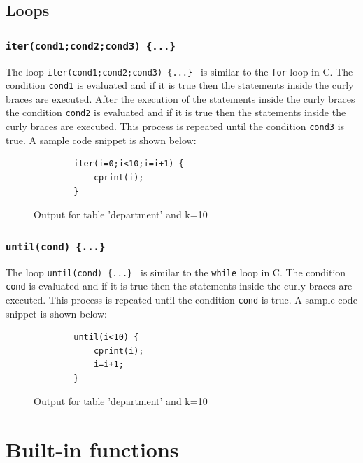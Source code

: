 \documentclass[12pt]{article}
\begin{document}
\subsection{Loops}
\subsubsection{\texttt{iter(cond1;cond2;cond3) \{...\} }}
The loop \texttt{iter(cond1;cond2;cond3) \{...\} } is similar to the \texttt{for} loop in C. The condition \texttt{cond1} is evaluated and if it is true then the statements inside the curly braces are executed. After the execution of the statements inside the curly braces the condition \texttt{cond2} is evaluated and if it is true then the statements inside the curly braces are executed. This process is repeated until the condition \texttt{cond3} is true.
A sample code snippet is shown below:
\begin{figure}[H]
    \label{iter}
    \centering
    \begin{BVerbatim}
        iter(i=0;i<10;i=i+1) {
            cprint(i);
        }
    \end{BVerbatim}
    \caption{Output for table 'department' and k=10}
    \end{figure}
\subsubsection{\texttt{until(cond) \{...\} }}
The loop \texttt{until(cond) \{...\} } is similar to the \texttt{while} loop in C. The condition \texttt{cond} is evaluated and if it is true then the statements inside the curly braces are executed. This process is repeated until the condition \texttt{cond} is true.
A sample code snippet is shown below:
\begin{figure}[H]
    \label{until}
    \centering
    \begin{BVerbatim}
        until(i<10) {
            cprint(i);
            i=i+1;
        }
    \end{BVerbatim}
    \caption{Output for table 'department' and k=10}
    \end{figure}
\section{Built-in functions}
\end{document}
